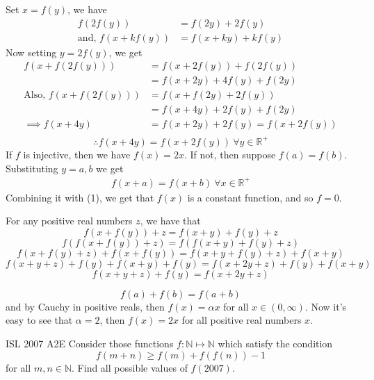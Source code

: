 \begin{solution}[substitution]
    Set $x = f(y)$, we have
    \[\begin{aligned}
        f\left(2f(y)\right) &= f(2y) + 2f(y)\\ 
        \text{and, } f(x+kf(y)) &= f(x+ky) + kf(y)
    \end{aligned}\]
    Now setting $y = 2f(y)$, we get
    \[\begin{aligned}
        f\left(x+f(2f(y))\right) &= f\left(x+2f(y)\right) + f(2f(y))\\
                                 &=f(x+2y) + 4f(y) + f(2y)\\[1em]
        \text{Also, } f(x+f(2f(y))) &= f(x+f(2y)+2f(y))\\
        &= f(x+4y) + 2f(y) + f(2y)\\[1em]
        \implies f(x+4y) &= f(x+2y) + 2f(y) = f(x+2f(y))\\
    \end{aligned}\] 
    \begin{equation}
        \boxed{\therefore f(x+4y) = f(x+2f(y))} \ \forall y\in \mathbb{R}^+
    \end{equation}
    If $f$ is injective, then we have $\boxed{f(x) = 2x}$. If not, then
    suppose $f(a) = f(b)$. Substituting $y = a, b$ we get 
    \[\begin{aligned}
        f(x+a) = f(x+b) \ \forall x \in \mathbb{R}^+
    \end{aligned}\]
    Combining it with (1), we get that $f(x)$ is a constant function, and so
    $\boxed{f=0}$.
\end{solution}

\begin{solution}
    For any positive real numbers $ z$, we have that 
    \[f(x+f(y))+z=f(x+y)+f(y)+z\] 
    \[f(f(x+f(y))+z)=f(f(x+y)+f(y)+z)\] 
    \[f(x+f(y)+z)+f(x+f(y))=f(x+y+f(y)+z)+f(x+y)\] 
    \[f(x+y+z)+f(y)+f(x+y)+f(y)=f(x+2y+z)+f(y)+f(x+y)\] 
    \[f(x+y+z)+f(y)=f(x+2y+z)\] 

    \[\boxed{f(a)+f(b)=f(a+b)}\] and by Cauchy in positive reals, then $
    f(x)=\alpha x$ for all $ x \in (0, \infty)$. Now it's easy to see that $
    \alpha=2$, then $ f(x)=2x$ for all positive real numbers $ x$.
\end{solution}


{ISL 2007 A2}{E}{
    Consider those functions $ f: \mathbb{N} \mapsto \mathbb{N}$ which satisfy the condition
    \[f(m + n) \geq f(m)+f(f(n))-1\]
    for all $ m,n \in \mathbb{N}.$ Find all possible values of $f(2007)$.
}

